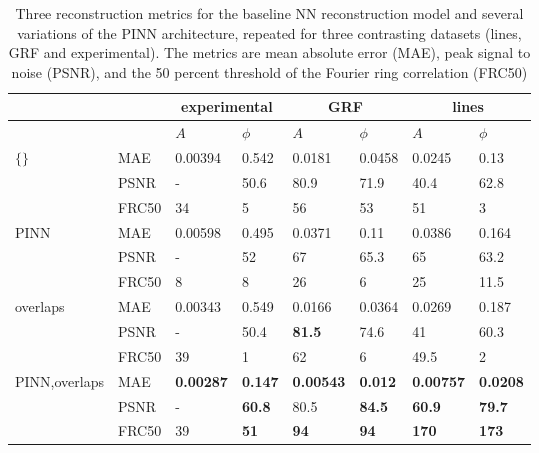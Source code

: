 \documentclass[sn-mathphys]{sn-jnl}%
\theoremstyle{thmstyleone}%
\theoremstyle{thmstyletwo}%
\theoremstyle{thmstylethree}%
\begin{document}
\begin{table}[h]
\begin{center}
\caption{Three reconstruction metrics for the baseline NN reconstruction model and several variations of the PINN architecture, repeated for three contrasting datasets (lines, GRF and experimental). The metrics are mean absolute error (MAE), peak signal to noise (PSNR), and the 50 percent threshold of the Fourier ring correlation (FRC50) }\label{tab1}%
\begin{tabular}{p{2cm}l|ll|ll|ll}
\toprule 
    & \multicolumn{1}{c}{} & \multicolumn{2}{c}{experimental} & \multicolumn{2}{c}{GRF} & \multicolumn{2}{c}{lines}\\
    \midrule
    &
    & $A$ & $\phi$
    & $A$ & $\phi$
    & $A$ & $\phi$ \\
    \midrule
$\{\}$\footnotemark[1]    
& MAE & 0.00394 & 0.542 & 0.0181 & 0.0458 & 0.0245 & 0.13 \\
& PSNR & -  & 50.6 & 80.9 & 71.9 & 40.4 & 62.8 \\
& FRC50 & 34 & 5 & 56 & 53 & 51 & 3 \\
    \midrule
$\mathrm{PINN} $
& MAE & 0.00598 & 0.495 & 0.0371 & 0.11 & 0.0386 & 0.164 \\
& PSNR & -  & 52 & 67 & 65.3 & 65 & 63.2 \\
& FRC50 & 8 & 8 & 26 & 6 & 25 & 11.5 \\
    \midrule
overlaps
& MAE & 0.00343 & 0.549 & 0.0166 & 0.0364 & 0.0269 & 0.187 \\
& PSNR & -  & 50.4 & \textbf{81.5} & 74.6 & 41 & 60.3 \\
& FRC50 & 39 & 1 & 62 & 6 & 49.5 & 2 \\
    \midrule
PINN,overlaps\footnotemark[2]    
& MAE & \textbf{0.00287} & \textbf{0.147} & \textbf{0.00543} & \textbf{0.012} & \textbf{0.00757} & \textbf{0.0208} \\
& PSNR & -  & \textbf{60.8} & 80.5 & \textbf{84.5} & \textbf{60.9} & \textbf{79.7} \\
& FRC50 & 39 & \textbf{51} & \textbf{94} & \textbf{94} & \textbf{170} & \textbf{173} \\
\end{tabular}
\end{center}
\end{table}
\end{document}
